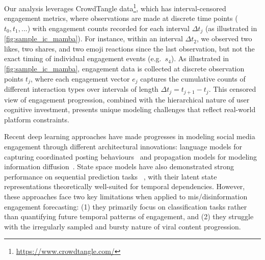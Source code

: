 Our analysis leverages CrowdTangle data\footnote{\url{https://www.crowdtangle.com/}}, which has interval-censored engagement metrics, where observations are made at discrete time points ($t_0, t_1, ...$) with engagement counts recorded for each interval $\Delta t_j$ (as illustrated in \cref{fig:sample_ic_mamba}). For instance, within an interval $\Delta t_2$, we observed two likes, two shares, and two emoji reactions since the last observation, but not the exact timing of individual engagement events (e.g.\ $s_4$). As illustrated in \cref{fig:sample_ic_mamba}, engagement data is collected at discrete observation points $t_j$, where each engagement vector $e_j$ captures the cumulative counts of different interaction types over intervals of length $\Delta t_j = t_{j+1} - t_j$. This censored view of engagement progression, combined with the hierarchical nature of user cognitive investment, presents unique modeling challenges that reflect real-world platform constraints.

Recent deep learning approaches have made progresses in modeling social media engagement through different architectural innovations: language models for capturing coordinated posting behaviours~\citep{atanasov2019predicting,tian2023metatroll} and propagation models for modeling information diffusion~\citep{zannettou2019disinformation,im2020still,luceri2024unmasking,kong2023interval}. State space models have also demonstrated strong performance on sequential prediction tasks ~\citep{mamba,mamba2}, with their latent state representations theoretically well-suited for temporal dependencies. However, these approaches face two key limitations when applied to mis/disinformation engagement forecasting: (1) they primarily focus on classification tasks rather than quantifying future temporal patterns of engagement, and (2) they struggle with the irregularly sampled and bursty nature of viral content progression.



